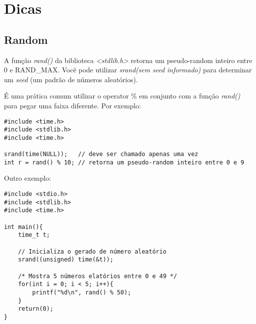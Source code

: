 \documentclass[defesa,oneside]{ppginf}
\begin{document}

\appendix

\chapter{Dicas}

\section{Random}

A função \emph{rand()} da biblioteca \emph{<stdlib.h>} retorna um pseudo-random inteiro entre 0 e RAND\_MAX. Vocẽ pode utilizar \emph{srand(sem seed informado)} para determinar um \textit{seed} (um padrão de números aleatórios). 

É uma prática comum utilizar o operator \% em conjunto com a função \emph{rand()} para pegar uma faixa diferente. Por exemplo:

\begin{lstlisting}
#include <time.h>
#include <stdlib.h>
#include <time.h>

srand(time(NULL));   // deve ser chamado apenas uma vez
int r = rand() % 10; // retorna um pseudo-random inteiro entre 0 e 9 
\end{lstlisting}

Outro exemplo:

\begin{lstlisting}
#include <stdio.h>
#include <stdlib.h>
#include <time.h>

int main(){
	time_t t;
	
	// Inicializa o gerado de número aleatório		
	srand((unsigned) time(&t)); 
	
	/* Mostra 5 números elatórios entre 0 e 49 */
	for(int i = 0; i < 5; i++){
		printf("%d\n", rand() % 50);
	}	
	return(0);
}
\end{lstlisting}
\end{document}
